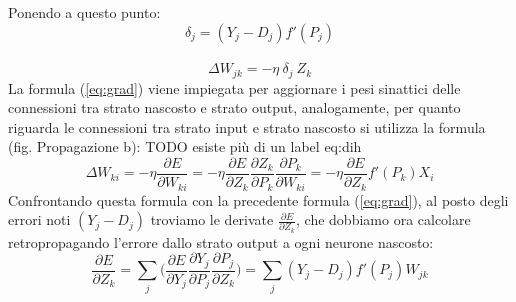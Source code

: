 \documentclass[10pt,a4paper]{article}
\begin{document}
Ponendo a questo punto:
\begin{equation} \label{eq:cr}
\delta_j = (Y_j - D_j)f'(P_j) 
\end{equation}
\\
\begin{equation} \label{eq:gradcr}
\Delta W_{jk} = -\eta \ \delta_j \ Z_k
\end{equation}
La formula (\ref{eq:grad}) viene impiegata per aggiornare i pesi sinattici delle connessioni tra strato nascosto e strato output, analogamente, per quanto riguarda le connessioni tra strato input e strato nascosto si utilizza la formula (fig. Propagazione b):
TODO esiste pi\`u di un label eq:dih
\begin{equation} \label{eq:dih}
\Delta W_{ki} = -\eta \frac{\partial E}{\partial W_{ki}} = - \eta \frac{\partial E}{\partial Z_k} \frac{\partial Z_k}{\partial P_k} \frac{\partial P_k}{\partial W_{ki}} = -\eta \frac{\partial E}{\partial Z_k}f'(P_k)X_i
\end{equation}
Confrontando questa formula con la precedente formula (\ref{eq:grad}), al posto degli errori noti $(Y_j - D_j)$ troviamo le derivate $\frac{\partial E}{\partial Z_k}$, che dobbiamo ora calcolare retropropagando l'errore dallo strato output a ogni neurone nascosto:
\begin{equation} 
\frac{\partial E}{\partial Z_k} = \sum_j \Bigg( \frac{\partial E}{\partial Y_j} \frac{\partial Y_j}{\partial P_j} \frac{\partial P_j}{\partial Z_k} \Bigg) = \sum_j (Y_j - D_j)f'(P_j)W_{jk} 
\end{equation}
\end{document}
